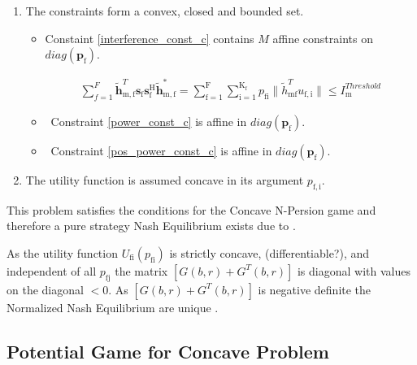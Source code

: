 \documentclass[12pt,a4paper]{report}
\begin{document}
\begin{enumerate}

\item
The constraints form a convex, closed and bounded set. 

\begin{itemize}

\item
	Constaint \eqref{interference_const_c} contains $M$ affine constraints on $diag(\mathbf{p_{\mathrm{f}}})$.

\begin{gather*}
	  \sum^F_{f=1} \mathbf{\tilde{h}}_{\mathrm{m,f}}^T  \mathbf{s}_{\mathrm{f}} 						
	\mathbf{s_{\mathrm{f}}^{\mathrm{H}}} \mathbf{\tilde{h}_{\mathrm{m,f}}^*} 
	=
	\sum_{\mathrm{f=1}}^{\mathrm{F}}	\sum_{\mathrm{i=1}}^{\mathrm{K_f}}
	p_{\mathrm{fi}}\|\tilde{h}_{\mathrm{mf}}^T u_{\mathrm{f,i}}\|
	\leq I^{Threshold}_{\mathrm{m}} 
\end{gather*}

\item \
	Constraint \eqref{power_const_c} is  affine in $diag(\mathbf{p_{\mathrm{f}}})$.
	
\item \
	Constraint \eqref{pos_power_const_c} is affine in $diag(\mathbf{p_{\mathrm{f}}})$.
\end{itemize}


\item The utility function is assumed concave in its argument $p_{\mathrm{f,i}}$.

\end{enumerate}

This problem satisfies the conditions for the Concave N-Persion game and therefore a pure strategy Nash Equilibrium exists due to 
\cite[Thm1]{rosen1964existence}.

As the utility function $U_{\mathrm{fi}}(p_{\mathrm{fi}})$ is strictly concave, (differentiable?), and independent of all $p_{\mathrm{fj}}$ the matrix $[G(b,r)+G^{T}(b,r)] $ is diagonal with values on the diagonal $<0$. As $[G(b,r)+G^{T}(b,r)] $ is negative definite the Normalized Nash Equilibrium are unique \cite[Thm4]{rosen1964existence}.

\subsection{Potential Game for Concave Problem}
\end{document}
